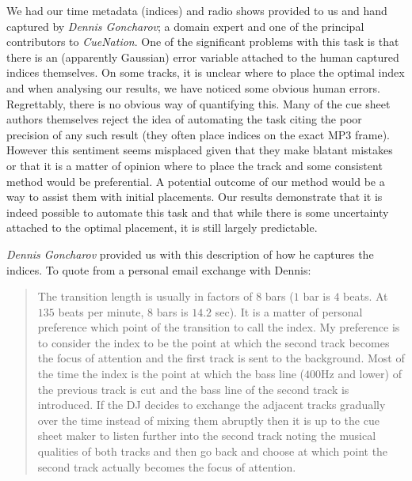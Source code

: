 \documentclass[twocolumn]{article}
\begin{document}
We had our time metadata (indices) and radio shows provided to us and hand captured by \textit{Dennis Goncharov}; a domain expert and one of the principal contributors to \textit{CueNation}. One of the significant problems with this task is that there is an (apparently Gaussian) error variable attached to the human captured indices themselves. On some tracks, it is unclear where to place the optimal index and when analysing our results, we have noticed some obvious human errors. Regrettably, there is no obvious way of quantifying this. Many of the cue sheet authors themselves reject the idea of automating the task citing the poor precision of any such result (they often place indices on the exact MP3 frame). However this sentiment seems misplaced given that they make blatant mistakes or that it is a matter of opinion where to place the track and some consistent method would be preferential. A potential outcome of our method would be a way to assist them with initial placements. Our results demonstrate that it is indeed possible to automate this task and that while there is some uncertainty attached to the optimal placement, it is still largely predictable.

\textit{Dennis Goncharov} provided us with this description of how he captures the indices. To quote from a personal email exchange with Dennis:

\begin{quote}
	The transition length is usually in factors of $8$ bars ($1$ bar is $4$ beats. At $135$ beats per minute, $8$ bars is $14.2$ sec). It is a matter of personal preference which point of the transition to call the index. My preference is to consider the index to be the point at which the second track becomes the focus of attention and the first track is sent to the background. Most of the time the index is the point at which the bass line ($400$Hz and lower) of the previous track is cut and the bass line of the second track is introduced. If the DJ decides to exchange the adjacent tracks gradually over the time instead of mixing them abruptly then it is up to the cue sheet maker to listen further into the second track noting the musical qualities of both tracks and then go back and choose at which point the second track actually becomes the focus of attention.
\end{quote}
\end{document}
